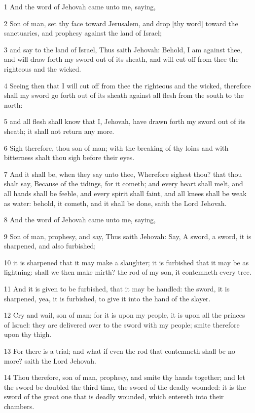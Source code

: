 \par 1 And the word of Jehovah came unto me, saying,
\par 2 Son of man, set thy face toward Jerusalem, and drop [thy word] toward the sanctuaries, and prophesy against the land of Israel;
\par 3 and say to the land of Israel, Thus saith Jehovah: Behold, I am against thee, and will draw forth my sword out of its sheath, and will cut off from thee the righteous and the wicked.
\par 4 Seeing then that I will cut off from thee the righteous and the wicked, therefore shall my sword go forth out of its sheath against all flesh from the south to the north:
\par 5 and all flesh shall know that I, Jehovah, have drawn forth my sword out of its sheath; it shall not return any more.
\par 6 Sigh therefore, thou son of man; with the breaking of thy loins and with bitterness shalt thou sigh before their eyes.
\par 7 And it shall be, when they say unto thee, Wherefore sighest thou? that thou shalt say, Because of the tidings, for it cometh; and every heart shall melt, and all hands shall be feeble, and every spirit shall faint, and all knees shall be weak as water: behold, it cometh, and it shall be done, saith the Lord Jehovah.
\par 8 And the word of Jehovah came unto me, saying,
\par 9 Son of man, prophesy, and say, Thus saith Jehovah: Say, A sword, a sword, it is sharpened, and also furbished;
\par 10 it is sharpened that it may make a slaughter; it is furbished that it may be as lightning: shall we then make mirth? the rod of my son, it contemneth every tree.
\par 11 And it is given to be furbished, that it may be handled: the sword, it is sharpened, yea, it is furbished, to give it into the hand of the slayer.
\par 12 Cry and wail, son of man; for it is upon my people, it is upon all the princes of Israel: they are delivered over to the sword with my people; smite therefore upon thy thigh.
\par 13 For there is a trial; and what if even the rod that contemneth shall be no more? saith the Lord Jehovah.
\par 14 Thou therefore, son of man, prophesy, and smite thy hands together; and let the sword be doubled the third time, the sword of the deadly wounded: it is the sword of the great one that is deadly wounded, which entereth into their chambers.
